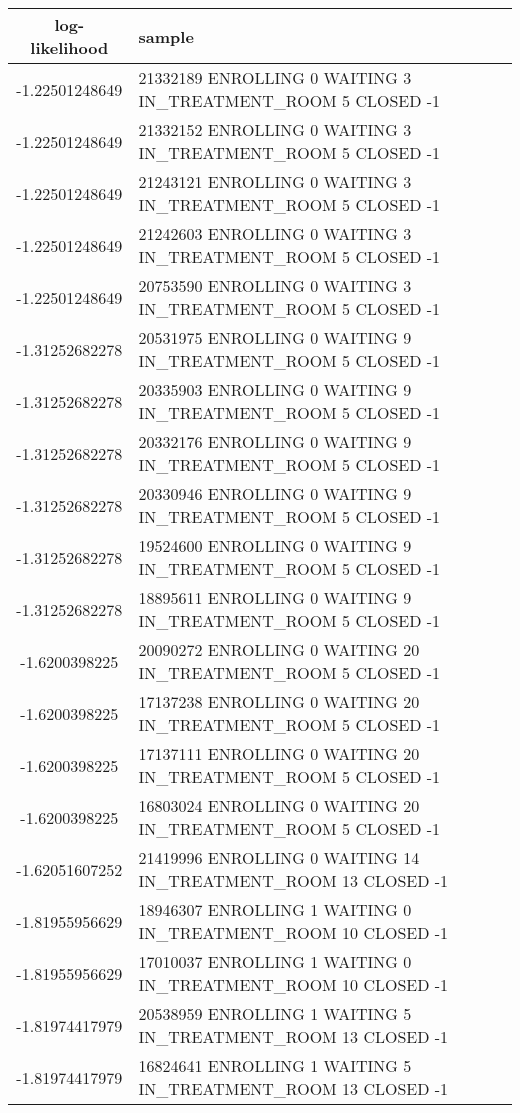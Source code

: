 \newpage
{\scriptsize
\begin{longtable}{|c|p{}|}
\hline
log-likelihood & sample \\ \hline
-1.22501248649 & 21332189 ENROLLING 0 WAITING 3 IN\_TREATMENT\_ROOM 5 CLOSED -1 \\
-1.22501248649 & 21332152 ENROLLING 0 WAITING 3 IN\_TREATMENT\_ROOM 5 CLOSED -1 \\
-1.22501248649 & 21243121 ENROLLING 0 WAITING 3 IN\_TREATMENT\_ROOM 5 CLOSED -1 \\
-1.22501248649 & 21242603 ENROLLING 0 WAITING 3 IN\_TREATMENT\_ROOM 5 CLOSED -1 \\
-1.22501248649 & 20753590 ENROLLING 0 WAITING 3 IN\_TREATMENT\_ROOM 5 CLOSED -1 \\
\hline
-1.31252682278 & 20531975 ENROLLING 0 WAITING 9 IN\_TREATMENT\_ROOM 5 CLOSED -1 \\
-1.31252682278 & 20335903 ENROLLING 0 WAITING 9 IN\_TREATMENT\_ROOM 5 CLOSED -1 \\
-1.31252682278 & 20332176 ENROLLING 0 WAITING 9 IN\_TREATMENT\_ROOM 5 CLOSED -1 \\
-1.31252682278 & 20330946 ENROLLING 0 WAITING 9 IN\_TREATMENT\_ROOM 5 CLOSED -1 \\
-1.31252682278 & 19524600 ENROLLING 0 WAITING 9 IN\_TREATMENT\_ROOM 5 CLOSED -1 \\
-1.31252682278 & 18895611 ENROLLING 0 WAITING 9 IN\_TREATMENT\_ROOM 5 CLOSED -1 \\
\hline
-1.6200398225 & 20090272 ENROLLING 0 WAITING 20 IN\_TREATMENT\_ROOM 5 CLOSED -1 \\
-1.6200398225 & 17137238 ENROLLING 0 WAITING 20 IN\_TREATMENT\_ROOM 5 CLOSED -1 \\
-1.6200398225 & 17137111 ENROLLING 0 WAITING 20 IN\_TREATMENT\_ROOM 5 CLOSED -1 \\
-1.6200398225 & 16803024 ENROLLING 0 WAITING 20 IN\_TREATMENT\_ROOM 5 CLOSED -1 \\
-1.62051607252 & 21419996 ENROLLING 0 WAITING 14 IN\_TREATMENT\_ROOM 13 CLOSED -1 \\
\hline
-1.81955956629 & 18946307 ENROLLING 1 WAITING 0 IN\_TREATMENT\_ROOM 10 CLOSED -1 \\
-1.81955956629 & 17010037 ENROLLING 1 WAITING 0 IN\_TREATMENT\_ROOM 10 CLOSED -1 \\
-1.81974417979 & 20538959 ENROLLING 1 WAITING 5 IN\_TREATMENT\_ROOM 13 CLOSED -1 \\
-1.81974417979 & 16824641 ENROLLING 1 WAITING 5 IN\_TREATMENT\_ROOM 13 CLOSED -1 \\

\end{longtable}}
